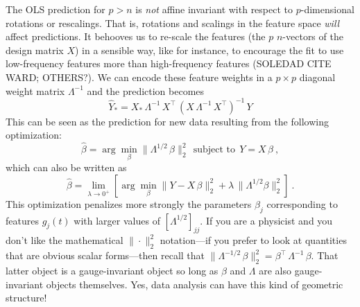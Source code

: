 \documentclass[12pt,letterpaper]{article}
\begin{document}
The OLS prediction for $p>n$ is \emph{not} affine invariant with respect to $p$-dimensional rotations or rescalings.
That is, rotations and scalings in the feature space \emph{will} affect predictions.
It behooves us to re-scale the features (the $p$ $n$-vectors of the design matrix $X$) in a sensible way, like for instance, to encourage the fit to use low-frequency features more than high-frequency features (SOLEDAD CITE WARD; OTHERS?).
We can encode these feature weights in a $p\times p$ diagonal weight matrix $\Lambda^{-1}$ and the prediction becomes
\begin{equation}
    \hat{Y}_\ast = X_\ast\,\Lambda^{-1}\,X^\top\,(X\,\Lambda^{-1}\,X^\top)^{-1}\,Y
\end{equation}
This can be seen as the prediction for new data resulting from the following optimization:
\begin{equation}
    \hat{\beta} = \arg\min_\beta \|\Lambda^{1/2}\,\beta\|_2^2 ~~\mbox{subject to}~~ Y = X\,\beta
    ~,
\end{equation}
which can also be written as
\begin{equation}
    \hat{\beta} = \lim_{\lambda\rightarrow 0^+}\left[\arg\min_\beta \|Y - X\,\beta\|_2^2 + \lambda\,\|\Lambda^{1/2}\beta\|_2^2\right]
    ~.
\end{equation}
This optimization penalizes more strongly the parameters $\beta_j$ corresponding to features $g_j(t)$ with larger values of $[\Lambda^{1/2}]_{jj}$.
If you are a physicist and you don't like the mathematical $\|\cdot\|_2^2$ notation---if you prefer to look at quantities that are obvious scalar forms---then recall that $\|\Lambda^{-1/2}\,\beta\|_2^2 = \beta^\top\,\Lambda^{-1}\,\beta$.
That latter object is a gauge-invariant object so long as $\beta$ and $\Lambda$ are also gauge-invariant objects themselves.
Yes, data analysis can have this kind of geometric structure!
\end{document}
